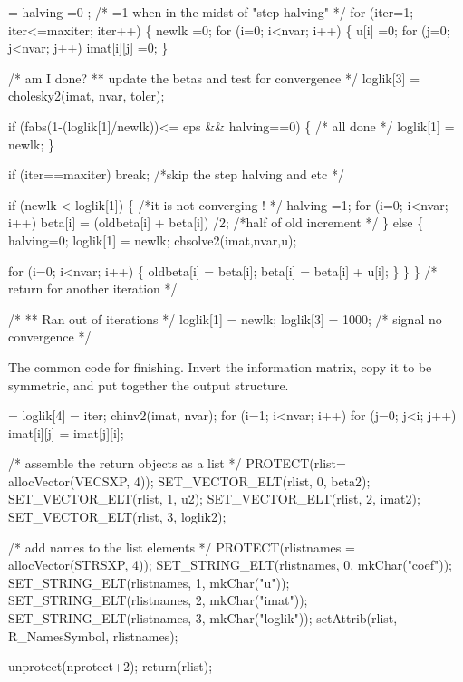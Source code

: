 \documentclass{article}
\begin{document}
\begin{nwchunk}
=
 halving =0 ;             /* =1 when in the midst of "step halving" */
 for (iter=1; iter<=maxiter; iter++) \{
     newlk =0;
     for (i=0; i<nvar; i++) \{
         u[i] =0;
         for (j=0; j<nvar; j++)
                 imat[i][j] =0;
         \}
                
     /* am I done?
     **   update the betas and test for convergence
     */
     loglik[3] = cholesky2(imat, nvar, toler); 
 
     if (fabs(1-(loglik[1]/newlk))<= eps && halving==0) \{ /* all done */
         loglik[1] = newlk;
         \}
 
     if (iter==maxiter) break;  /*skip the step halving and etc */
 
     if (newlk < loglik[1])   \{    /*it is not converging ! */
             halving =1;
             for (i=0; i<nvar; i++)
                 beta[i] = (oldbeta[i] + beta[i]) /2; /*half of old increment */
             \}
     else \{
             halving=0;
             loglik[1] = newlk;
             chsolve2(imat,nvar,u);
 
             for (i=0; i<nvar; i++) \{
                 oldbeta[i] = beta[i];
                 beta[i] = beta[i] +  u[i];
                 \}
             \}
     \}   /* return for another iteration */
 
 
 /*
 ** Ran out of iterations 
 */
 loglik[1] = newlk;
 loglik[3] = 1000;  /* signal no convergence */
\end{nwchunk}

The common code for finishing.  Invert the information matrix, copy it
to be symmetric, and put together the output structure.

\begin{nwchunk}
=
 loglik[4] = iter;
 chinv2(imat, nvar);
 for (i=1; i<nvar; i++)
     for (j=0; j<i; j++)  imat[i][j] = imat[j][i];
 
 /* assemble the return objects as a list */
 PROTECT(rlist= allocVector(VECSXP, 4));
 SET_VECTOR_ELT(rlist, 0, beta2);
 SET_VECTOR_ELT(rlist, 1, u2);
 SET_VECTOR_ELT(rlist, 2, imat2);
 SET_VECTOR_ELT(rlist, 3, loglik2);
 
 /* add names to the list elements */
 PROTECT(rlistnames = allocVector(STRSXP, 4));
 SET_STRING_ELT(rlistnames, 0, mkChar("coef"));
 SET_STRING_ELT(rlistnames, 1, mkChar("u"));
 SET_STRING_ELT(rlistnames, 2, mkChar("imat"));
 SET_STRING_ELT(rlistnames, 3, mkChar("loglik"));
 setAttrib(rlist, R_NamesSymbol, rlistnames);
 
 unprotect(nprotect+2);
 return(rlist);
\end{nwchunk}
\end{document}
